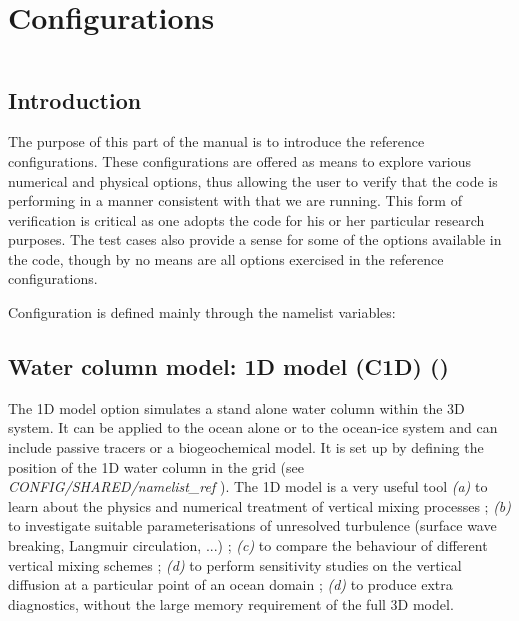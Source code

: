 \documentclass[NEMO_book]{subfiles}
\begin{document}
\chapter{Configurations}
\label{CFG}
\minitoc

\newpage
$\ $\newline    %

\section{Introduction}
\label{CFG_intro}


The purpose of this part of the manual is to introduce the \NEMO reference configurations. 
These configurations are offered as means to explore various numerical and physical options, 
thus allowing the user to verify that the code is performing in a manner consistent with that 
we are running. This form of verification is critical as one adopts the code for his or her particular 
research purposes. The test cases also provide a sense for some of the options available 
in the code, though by no means are all options exercised in the reference configurations.

Configuration is defined mainly through the  namelist variables:

\section{Water column model: 1D model (C1D) () }
\label{CFG_c1d}

The 1D model option simulates a stand alone water column within the 3D \NEMO system. 
It can be applied to the ocean alone or to the ocean-ice system and can include passive tracers 
or a biogeochemical model. It is set up by defining the position of the 1D water column in the grid 
(see \textit{CONFIG/SHARED/namelist\_ref} ). 
The 1D model is a very useful tool  
\textit{(a)} to learn about the physics and numerical treatment of vertical mixing processes ; 
\textit{(b)} to investigate suitable parameterisations of unresolved turbulence (surface wave
breaking, Langmuir circulation, ...) ; 
\textit{(c)} to compare the behaviour of different vertical mixing schemes  ; 
\textit{(d)} to perform sensitivity studies on the vertical diffusion at a particular point of an ocean domain ; 
\textit{(d)} to produce extra diagnostics, without the large memory requirement of the full 3D model.
\end{document}

